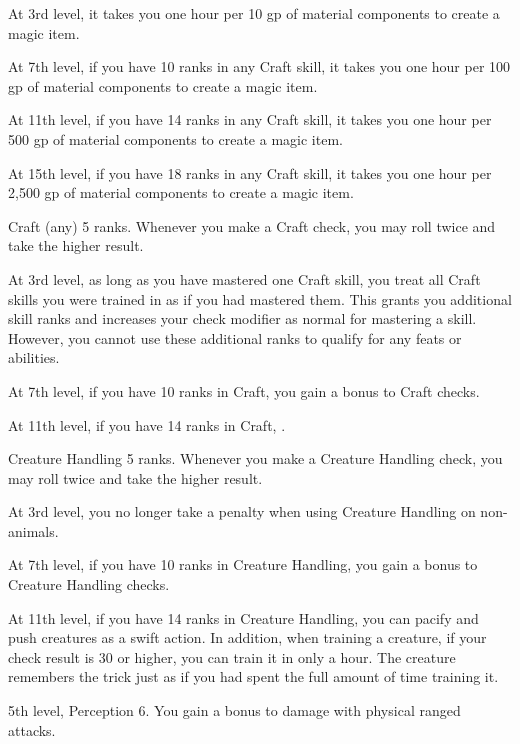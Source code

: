     At 3rd level, it takes you one hour per 10 gp of material components to create a magic item. %

    At 7th level, if you have 10 ranks in any Craft skill, it takes you one hour per 100 gp of material components to create a magic item. %

    At 11th level, if you have 14 ranks in any Craft skill, it takes you one hour per 500 gp of material components to create a magic item. %

    At 15th level, if you have 18 ranks in any Craft skill, it takes you one hour per 2,500 gp of material components to create a magic item. %

    \featpre Craft (any) 5 ranks.
    \featben Whenever you make a Craft check, you may roll twice and take the higher result.

    At 3rd level, as long as you have mastered one Craft skill, you treat all Craft skills you were trained in as if you had mastered them.
    This grants you additional skill ranks and increases your check modifier as normal for mastering a skill.
    However, you cannot use these additional ranks to qualify for any feats or abilities.

    At 7th level, if you have 10 ranks in Craft, you gain a  bonus to Craft checks.

    At 11th level, if you have 14 ranks in Craft, \tdash.

    \featpre Creature Handling 5 ranks.
    \featben Whenever you make a Creature Handling check, you may roll twice and take the higher result.

    At 3rd level, you no longer take a penalty when using Creature Handling on non-animals.

    At 7th level, if you have 10 ranks in Creature Handling, you gain a  bonus to Creature Handling checks.

    At 11th level, if you have 14 ranks in Creature Handling, you can pacify and push creatures as a swift action.
    In addition, when training a creature, if your check result is 30 or higher, you can train it in only a hour.
    The creature remembers the trick just as if you had spent the full amount of time training it.

    \featpres 5th level, Perception 6.
    \featben You gain a  bonus to damage with physical ranged attacks.

